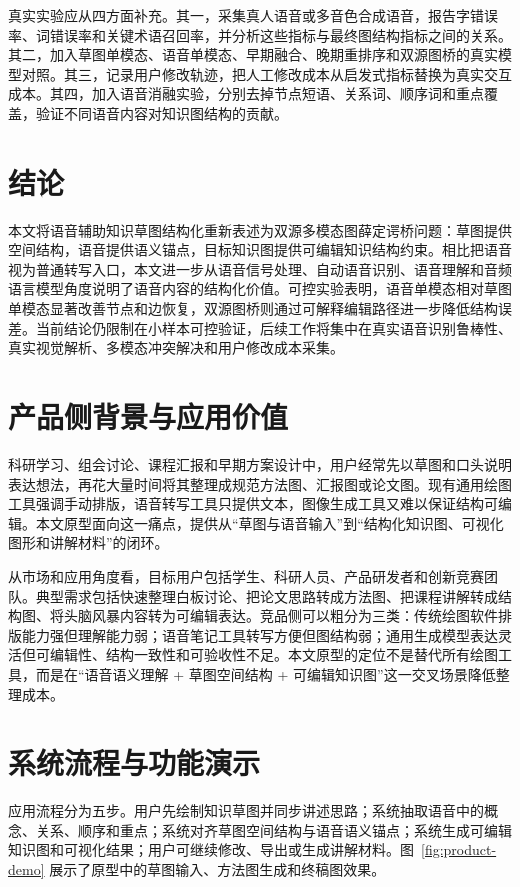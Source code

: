 \documentclass[UTF8,a4paper,12pt,fontset=fandol]{ctexart}
\begin{document}
真实实验应从四方面补充。其一，采集真人语音或多音色合成语音，报告字错误率、词错误率和关键术语召回率，并分析这些指标与最终图结构指标之间的关系。其二，加入草图单模态、语音单模态、早期融合、晚期重排序和双源图桥的真实模型对照。其三，记录用户修改轨迹，把人工修改成本从启发式指标替换为真实交互成本。其四，加入语音消融实验，分别去掉节点短语、关系词、顺序词和重点覆盖，验证不同语音内容对知识图结构的贡献。

\section{结论}

本文将语音辅助知识草图结构化重新表述为双源多模态图薛定谔桥问题：草图提供空间结构，语音提供语义锚点，目标知识图提供可编辑知识结构约束。相比把语音视为普通转写入口，本文进一步从语音信号处理、自动语音识别、语音理解和音频语言模型角度说明了语音内容的结构化价值。可控实验表明，语音单模态相对草图单模态显著改善节点和边恢复，双源图桥则通过可解释编辑路径进一步降低结构误差。当前结论仍限制在小样本可控验证，后续工作将集中在真实语音识别鲁棒性、真实视觉解析、多模态冲突解决和用户修改成本采集。

\clearpage
\appendix
\section{产品侧背景与应用价值}

科研学习、组会讨论、课程汇报和早期方案设计中，用户经常先以草图和口头说明表达想法，再花大量时间将其整理成规范方法图、汇报图或论文图。现有通用绘图工具强调手动排版，语音转写工具只提供文本，图像生成工具又难以保证结构可编辑。本文原型面向这一痛点，提供从“草图与语音输入”到“结构化知识图、可视化图形和讲解材料”的闭环。

从市场和应用角度看，目标用户包括学生、科研人员、产品研发者和创新竞赛团队。典型需求包括快速整理白板讨论、把论文思路转成方法图、把课程讲解转成结构图、将头脑风暴内容转为可编辑表达。竞品侧可以粗分为三类：传统绘图软件排版能力强但理解能力弱；语音笔记工具转写方便但图结构弱；通用生成模型表达灵活但可编辑性、结构一致性和可验收性不足。本文原型的定位不是替代所有绘图工具，而是在“语音语义理解 + 草图空间结构 + 可编辑知识图”这一交叉场景降低整理成本。

\section{系统流程与功能演示}

应用流程分为五步。用户先绘制知识草图并同步讲述思路；系统抽取语音中的概念、关系、顺序和重点；系统对齐草图空间结构与语音语义锚点；系统生成可编辑知识图和可视化结果；用户可继续修改、导出或生成讲解材料。图~\ref{fig:product-demo} 展示了原型中的草图输入、方法图生成和终稿图效果。
\end{document}
